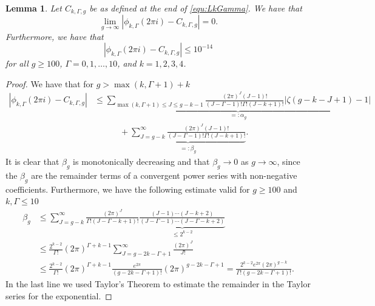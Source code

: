 \documentclass[12pt]{amsart}
\newtheorem{lem}[thm]{Lemma}
\theoremstyle{definition}
\numberwithin{equation}{section}
\theoremstyle{definition} %
\theoremstyle{remark}
\begin{document}
\begin{lem}\label{lem:err leading}
Let $C_{k,\Gamma,g}$ be as defined at the end of \eqref{equ:LkGamma}. We have that 
\[
    \lim_{g\to\infty}|\phi_{k,\Gamma}(2\pi i)-C_{k,\Gamma,g}| = 0.
\]
Furthermore, we have that 
\[
    |\phi_{k,\Gamma}(2\pi i)-C_{k,\Gamma,g}| \leq 10^{-14}
\]
for all $g\geq 100$, $\Gamma=0,1,\dots ,10$, and $k=1,2,3,4$.
\end{lem}
\newcommand{\ta}{\alpha}
\newcommand{\tb}{\beta}
\begin{proof}
  We have that for $g>\max(k,\Gamma+1)+k$
  \begin{align*}
    |\phi_{k,\Gamma}(2\pi i)-C_{k,\Gamma,g}|
    &\leq 
    \underbrace{
        \sum_{\max(k,\Gamma+1)\leq J\leq g-k-1} 
    \frac{(2\pi)^J (J-1)!}{ (J-\Gamma-1)! \Gamma!(J-k+1)!}
    |\zeta(g-k-J+1)-1|
     }_{=:\ta_{g}}
    \\&\quad\quad\quad +
     \underbrace{
        \sum_{J= g-k}^\infty 
    \frac{(2\pi)^J (J-1)!}{ (J-\Gamma-1)! \Gamma!(J-k+1)!}
     }_{=:\tb_{g}}.
  \end{align*}
  It is clear that $\tb_{g}$ is monotonically decreasing and that $\tb_{g}\to 0$ as $g\to \infty$, since the $\tb_{g}$ are the remainder terms of a convergent power series with non-negative coefficients.
  Furthermore, we have the following estimate valid for $g\geq 100$ and $k,\Gamma\leq 10$
  \begin{align*}
    \tb_{g}&\leq 
    \sum_{J= g-k}^\infty 
    \frac{(2\pi)^J }{ \Gamma!(J-\Gamma-k+1)!} 
    \underbrace{\frac{(J-1)\cdots(J-k+2)}{(J-\Gamma-1)\cdots(J-\Gamma-k+2)}}_{\leq 2^{k-2}}
    \\&\leq
    \frac{2^{k-2}}{\Gamma!}
    (2\pi)^{\Gamma+k-1}
    \sum_{J= g-2k-\Gamma+1}^\infty 
    \frac{(2\pi)^J }{ J!} 
    \\&\leq \frac{2^{k-2}}{\Gamma!}
    (2\pi)^{\Gamma+k-1}
    \frac{e^{2\pi}}{(g-2k-\Gamma+1)!} (2\pi)^{g-2k-\Gamma+1}  
    =\frac{2^{k-2}e^{2\pi}(2\pi)^{g-k}}{\Gamma!(g-2k-\Gamma+1)!}.
  \end{align*}
  In the last line we used Taylor's Theorem to estimate the remainder in the Taylor series for the exponential.



\end{proof}
\end{document}
